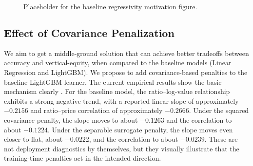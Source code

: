 \documentclass[12pt, draft]{article}
\theoremstyle{plain}
\theoremstyle{definition}
\newcommand{\1}{\mathbf{1}}
\begin{document}
\begin{table}[!ht]
\centering
\caption{Baseline comparison on the \textit{assessment} set (2024). Lower is better for MAE, COD, and COV. For PRD, values closer to one are preferred; for VEI and PRB, values closer to zero are preferred.}
\label{tab:baseline_models_2}
\end{table}


\begin{figure}[t]
\centering
{}
\caption{Placeholder for the baseline regressivity motivation figure.}
\label{fig:baseline_regressivity_placeholder}
\end{figure}

\subsection{Effect of Covariance Penalization}

We aim to get a middle-ground solution that can achieve better tradeoffs between accuracy and vertical-equity, when compared to the baseline models (Linear Regression and LightGBM). We propose to add covariance-based penalties to the baseline LightGBM learner. The current empirical results show the basic mechanism clearly . For the baseline model, the ratio--log-value relationship exhibits a strong negative trend, with a reported linear slope of approximately \(-0.2156\) and ratio--price correlation of approximately \(-0.2666\). Under the squared covariance penalty, the slope moves to about \(-0.1263\) and the correlation to about \(-0.1224\). Under the separable surrogate penalty, the slope moves even closer to flat, about \(-0.0222\), and the correlation to about \(-0.0239\). These are not deployment diagnostics by themselves, but they visually illustrate that the training-time penalties act in the intended direction.
\end{document}
